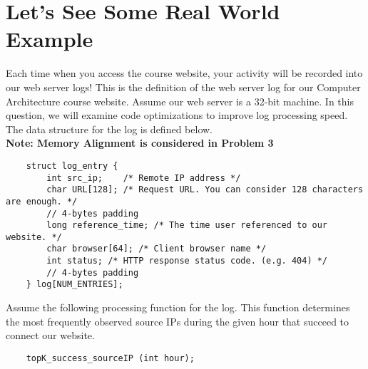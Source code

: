 \section{Let's See Some Real World Example}

Each time when you access the course website, your activity will be
recorded into our web server logs! This is the definition of the web
server log for our Computer Architecture course website. Assume our
web server is a 32-bit machine. In this question, we will examine
code optimizations to improve log processing speed. The data
structure for the log is defined below.\\
\textbf{Note: Memory Alignment is considered in Problem 3}
\begin{verbatim}
    struct log_entry {
        int src_ip;    /* Remote IP address */
        char URL[128]; /* Request URL. You can consider 128 characters are enough. */
        // 4-bytes padding 
        long reference_time; /* The time user referenced to our website. */
        char browser[64]; /* Client browser name */
        int status; /* HTTP response status code. (e.g. 404) */
        // 4-bytes padding 
    } log[NUM_ENTRIES];
\end{verbatim}
Assume the following processing function for the log. This function
determines the most frequently observed source IPs during the given
hour that succeed to connect our website.

\begin{verbatim}
    topK_success_sourceIP (int hour);
\end{verbatim}

